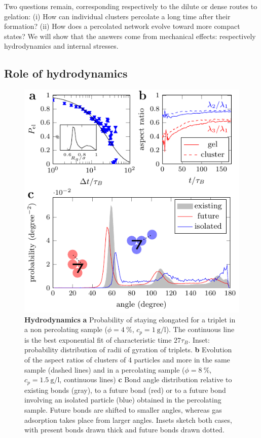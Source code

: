 Two questions remain, corresponding respectively to the dilute or dense routes to gelation: (i) How can individual clusters percolate a long time after their formation? (ii) How does a percolated network evolve toward more compact states? We will show that the answers come from mechanical effects: respectively hydrodynamics and internal stresses.

\subsection*{Role of hydrodynamics}

\begin{figure}
	\includegraphics{figs/hydro.pdf}
	\caption{\textbf{Hydrodynamics} \textbf{a} Probability of staying elongated for a triplet in a non percolating sample ($\phi=4~\%$, $c_p=\SI{1}{\gram\per\litre}$). The continuous line is the best exponential fit of characteristic time $27\tau_B$. Inset: probability distribution of radii of gyration of triplets. \textbf{b} Evolution of the aspect ratios of clusters of 4 particles and more in the same sample (dashed lines) and in a percolating sample ($\phi=8~\%$, $c_p=\SI{1.5}{\gram\per\litre}$, continuous lines) \textbf{c} Bond angle distribution relative to existing bonds (gray), to a future bond (red) or to a future bond involving an isolated particle (blue) obtained in the percolating sample. Future bonds are shifted to smaller angles, whereas gas adsorption takes place from larger angles. Insets sketch both cases, with present bonds drawn thick and future bonds drawn dotted.}
	\label{fig:hydro}
\end{figure}


